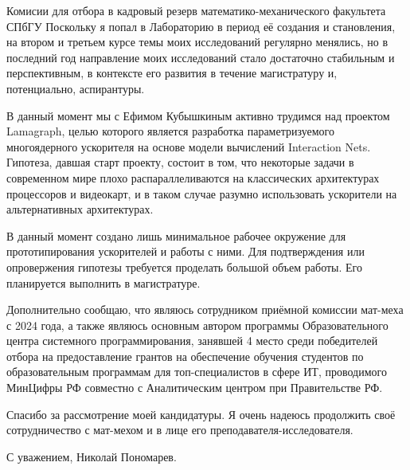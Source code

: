 \documentclass[foldmarks=false, enlargefirstpage=true,
    firstfoot=false, fromphone, fromemail, version=last]{scrlttr2}
\begin{document}
\begin{letter}{Комисии для отбора в кадровый резерв математико-механического факультета СПбГУ}
    Поскольку я попал в Лабораторию в период её создания и становления, на втором и третьем курсе темы моих исследований регулярно менялись, но в последний год направление моих исследований стало достаточно стабильным и перспективным, в контексте его развития в течение магистратуру и, потенциально, аспирантуры.

    В данный момент мы с Ефимом Кубышкиным активно трудимся над проектом Lamagraph, целью которого является разработка параметризуемого многоядерного ускорителя на основе модели вычислений \textenglish{Interaction Nets}.
    Гипотеза, давшая старт проекту, состоит в том, что некоторые задачи в современном мире плохо распараллеливаются на классических архитектурах процессоров и видеокарт, и в таком случае разумно использовать ускорители на альтернативных архитектурах.

    В данный момент создано лишь минимальное рабочее окружение для прототипирования ускорителей и работы с ними.
    Для подтверждения или опровержения гипотезы требуется проделать большой объем работы.
    Его планируется выполнить в магистратуре.

    Дополнительно сообщаю, что являюсь сотрудником приёмной комиссии мат-меха с 2024 года, а также являюсь основным автором программы Образовательного центра системного программирования, занявшей 4 место среди победителей отбора на предоставление грантов на обеспечение обучения студентов по образовательным программам для топ-специалистов в сфере ИТ, проводимого МинЦифры РФ совместно с Аналитическим центром при Правительстве РФ.

    Спасибо за рассмотрение моей кандидатуры.
    Я очень надеюсь продолжить своё сотрудничество с мат-мехом и в лице его преподавателя-исследователя.

    \closing{С уважением, Николай Пономарев.}
\end{letter}
\end{document}
